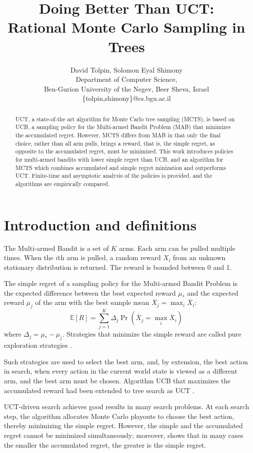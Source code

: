 \documentclass{article}
\title{Doing Better Than UCT: \\ Rational Monte Carlo Sampling in Trees}
\author {David Tolpin, Solomon Eyal Shimony \\
Department of Computer Science, \\
Ben-Gurion University of the Negev, Beer Sheva, Israel \\
\{tolpin,shimony\}@cs.bgu.ac.il}
\newcommand {\IE} {\ensuremath {\mathbb{E}}}
\begin{document}
\maketitle

\begin{abstract}
UCT, a state-of-the art algorithm for Monte Carlo tree sampling
(MCTS), is based on UCB, a sampling policy for the Multi-armed Bandit
Problem (MAB) that minimizes the accumulated regret. However, MCTS
differs from MAB in that only the final choice, rather than all arm
pulls, brings a reward, that is, the simple regret, as opposite to the
accumulated regret, must be minimized. This work introduces policies for
multi-armed bandits with lower simple regret than UCB, and an
algorithm for MCTS which combines accumulated and simple regret
minization and outperforms UCT. Finite-time and asymptotic analysis of
the policies is provided, and the algorithms are empirically compared.
\end{abstract}

\section{Introduction and definitions}

The Multi-armed Bandit is a set of $K$ arms. Each arm can be pulled
multiple times. When the $i$th arm is pulled, a random reward $X_i$
from an unknown stationary distribution is returned.  The reward is 
bounded between 0 and 1. 

The simple regret of a sampling policy for the Multi-armed Bandit
Problem is the expected difference between the best expected reward
$\mu_*$ and the expected reward $\mu_j$ of the arm with the best sample mean
$\overline X_j=\max_i\overline X_i$:
\begin{equation}
\label{eq:simple-regret}
\IE[R]=\sum_{j=1}^K\Delta_j\Pr(\overline X_j=\max_i\overline X_i)
\end{equation}
where $\Delta_j=\mu_*-\mu_j$.
Strategies that minimize the simple reward are called pure exploration
strategies \cite{Bubeck.pure}.

Such strategies are used to select the best arm, and, by
extension, the best action in search, when every action in the
current world state is viewed as a different arm, and the best arm
must be chosen. Algorithm UCB that maximizes the accumulated reward
\cite{Auer.ucb} had been extended to tree search as UCT \cite{Kocsis.uct}. 

UCT-driven search achieves good results in many search problems. At each
search step, the algorithm allocates Monte Carlo playouts to choose
the best action, thereby minimizing the simple regret. However, the
simple and the accumulated regret cannot be minimized simultaneously;
moreover, \cite{Bubeck.pure} shows that in many cases the smaller the
accumulated regret, the greater is the simple regret.
\end{document}
